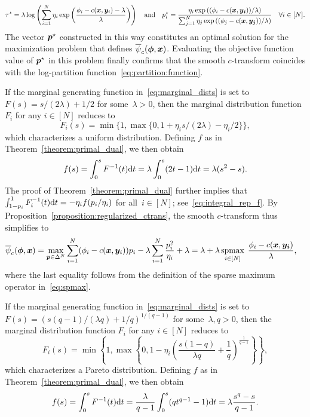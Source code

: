 \documentclass[11pt, a4paper, oneside, reqno]{article}
\begin{document}
\begin{example}
    \[\tau^\star = \lambda \log\left(\sum_{i=1}^N \eta_i \exp\left(\frac{\phi_i - c(\boldsymbol x, \boldsymbol y_i) - \lambda} {\lambda}\right)\right)\quad\text{and}\quad p_i^\star =\frac{\eta_i \exp\left(({\phi_i - c(\boldsymbol x, \boldsymbol {y_i}) )}/{\lambda}\right)}{ \sum_{j=1}^N \eta_j \exp\left(({\phi_j - c(\boldsymbol x,\boldsymbol {y_j}) })/{\lambda}  \right)}\quad \forall i \in [N].\]
    The vector $\boldsymbol p^\star$ constructed in this way constitutes an optimal solution for the maximization problem that defines $\overline{\psi}_c(\boldsymbol \phi, \boldsymbol x)$. Evaluating the objective function value of $\boldsymbol p^\star$ in this problem finally confirms that the smooth $c$-transform coincides with the log-partition function~\eqref{eq:partition:function}.
    \end{example}
    \begin{example}
	If the marginal generating function in~\eqref{eq:marginal_dists} is set to $F(s) = s/ (2\lambda) + 1/2$ for some~$\lambda>0$, then the marginal distribution function $F_i$ for any $i\in[N]$ reduces to 
	\[
	   F_i(s) = \min\{1, \max\{0, 1 + \eta_i s/ (2\lambda) -\eta_i/ 2 \}\},
	\]
	which characterizes a uniform distribution. Defining $f$ as in Theorem~\ref{theorem:primal_dual}, we then obtain
	\begin{align*}
	    f(s)=\int_0^s F^{-1}(t)\mathrm{d} t = \lambda \int_0^s (2t-1) \mathrm{d} t = \lambda(s^2 - s).
	\end{align*}
	The proof of Theorem~\ref{theorem:primal_dual} further implies that $\int_{1-p_i}^1 F_i^{-1}(t) \mathrm{d} t=-\eta_i f(p_i/\eta_i)$ for all~$i\in[N]$; see~\eqref{eq:integral_rep_f}. By Proposition~\ref{proposition:regularized_ctrans}, the smooth $c$-transform thus simplifies to 
	\begin{align*}
	    \overline{\psi}_c(\boldsymbol \phi, \boldsymbol x) & = \max\limits_{\boldsymbol p \in \Delta^N} \sum\limits_{i=1}^N (\phi_i - c(\boldsymbol x, \boldsymbol y_i))p_i - \lambda \sum\limits_{i=1}^N \frac{p_i^2}{\eta_i} + \lambda = \lambda + \lambda\operatorname*{spmax}_{i \in [N]} \;\frac{\phi_i - c(\boldsymbol x, \boldsymbol {y_i})}{\lambda}, 
	\end{align*}
	where the last equality follows from the definition of the sparse maximum operator in~\eqref{eq:spmax}.
    \end{example}
    
    \begin{example}
    If the marginal generating function in~\eqref{eq:marginal_dists} is set to $F(s) = (s (q-1) / (\lambda q)+1/q)^{1/(q-1)}$ for some~$\lambda, q>0$, then the marginal distribution function $F_i$ for any $i\in[N]$ reduces to 
	\[
	   F_i(s) = \min\left\{1, \max\left\{0, 1 - \eta_i \left( \frac{s (1-q)}{\lambda q} + \frac{1}{q} \right)^{\frac{1}{q-1}}  \right\} \right\},
	\]
	which characterizes a Pareto distribution. Defining $f$ as in Theorem~\ref{theorem:primal_dual}, we then obtain
	\begin{align*}
	    f(s)=\int_0^s F^{-1}(t) \mathrm{d} t = \frac{\lambda}{q-1} \int_0^s (q t^{q-1} - 1) \mathrm{d} t = \lambda \frac{s^q - s}{q-1}.
	\end{align*}
	\end{example}
	
\end{document}
